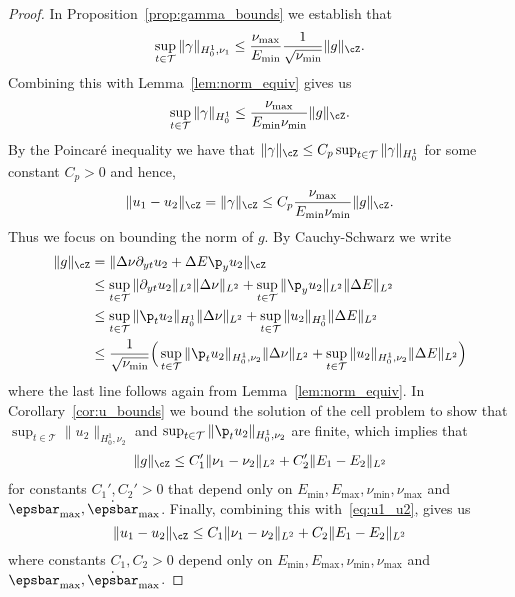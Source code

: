\documentclass[letterpaper,11pt]{article}
\begin{document}
\begin{proof}
In Proposition~\ref{prop:gamma_bounds} we establish that
\begin{equation}
    \sup_{t \in \mathcal{T}}\|\gamma\|_{H_0^1, \nu_1} \leq \frac{\nu_{\max}}{E_{\min}}\frac{1}{\sqrt{\nu_{\min}}}\|g\|_\cZ.
\end{equation}
Combining this with Lemma~\ref{lem:norm_equiv} gives us
\begin{align*}
    \sup_{t \in \mathcal{T}}\|\gamma\|_{H_0^1} \leq \frac{\nu_{\max}}{E_{\min}\nu_{\min}}\|g\|_\cZ.
\end{align*}
By the Poincar\'e inequality we have that $\|\gamma\|_\cZ \leq C_p\sup_{t \in \mathcal{T}}\|\gamma\|_{H_0^1}$ for some constant $C_p > 0$ and hence,
\begin{equation}\label{eq:u1_u2}
    \|u_1 - u_2\|_\cZ = \|\gamma\|_\cZ \leq C_p\frac{\nu_{\max}}{E_{\min}\nu_{\min}}\|g\|_\cZ.
\end{equation}
Thus we focus on  bounding the norm of $g$. By Cauchy-Schwarz we write
\begin{align*}
    \|g\|_\cZ &= \|\Delta\nu\partial_{yt}u_2 + \Delta E\p_yu_2\|_\cZ\\
    &\leq \sup_{t \in \mathcal{T}}\|\partial_{yt}u_2\|_{L^2}\|\Delta\nu\|_{L^2} + \sup_{t \in \mathcal{T}}\|\p_yu_2\|_{L^2}\|\Delta E\|_{L^2}\\
    &\leq \sup_{t \in \mathcal{T}}\|\p_tu_2\|_{H_0^1}\|\Delta\nu\|_{L^2} + \sup_{t \in \mathcal{T}}\|u_2\|_{H_0^1}\|\Delta E\|_{L^2}\\
    &\leq \frac{1}{\sqrt{\nu_{\min}}}\Big(\sup_{t \in \mathcal{T}}\|\p_tu_2\|_{H_0^1, \nu_2}\|\Delta\nu\|_{L^2} + \sup_{t \in \mathcal{T}}\|u_2\|_{H_0^1, \nu_2}\|\Delta E\|_{L^2}\Big)
\end{align*}
where the last line follows again from Lemma~\ref{lem:norm_equiv}. In Corollary~\ref{cor:u_bounds} we bound the solution of the cell problem
to show that $\sup_{t \in \mathcal{T}}\|u_2\|_{H_0^1, \nu_2}$ and $\sup_{t \in \mathcal{T}}\|\p_tu_2\|_{H_0^1, \nu_2}$ are finite, which implies that
\begin{align*}
    \|g\|_\cZ \leq C_1'\|\nu_1 - \nu_2\|_{L^2} + C_2'\|E_1 - E_2\|_{L^2}
\end{align*}
for constants $C_1', C_2' > 0$ that depend only on $E_{\min}, E_{\max}, \nu_{\min}, \nu_{\max}$ and $\epsbar_{\max}, \dot{\epsbar}_{\max}$. Finally, combining this with~\eqref{eq:u1_u2}, gives us
\begin{equation}
    \|u_1 - u_2\|_\cZ \leq C_1\|\nu_1 - \nu_2\|_{L^2} + C_2\|E_1 - E_2\|_{L^2}
\end{equation}
where constants $C_1, C_2 > 0$ depend only on $E_{\min}, E_{\max}, \nu_{\min}, \nu_{\max}$ and $\epsbar_{\max}, \dot{\epsbar}_{\max}$.
\end{proof}
\end{document}
